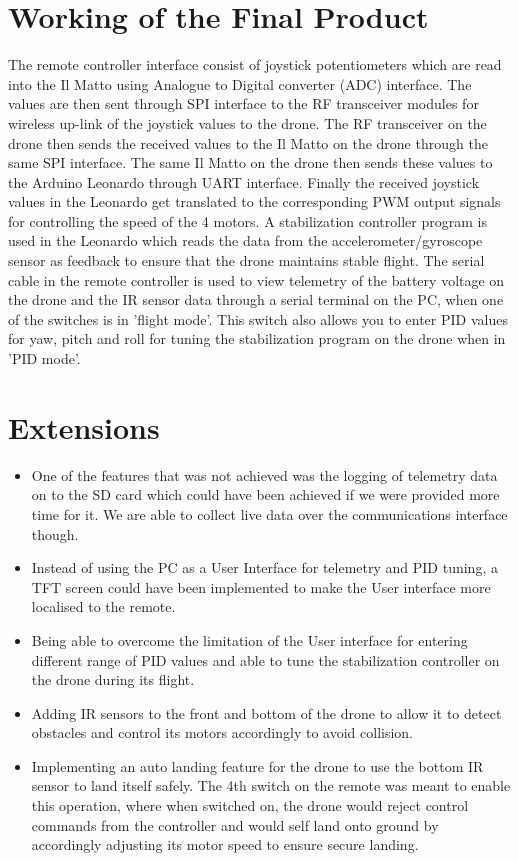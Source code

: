 \documentclass{article}
\begin{document}
\section{Working of the Final Product}
The remote controller interface consist of joystick potentiometers which are read into the Il Matto using Analogue to Digital converter (ADC) interface. The values are then sent through SPI interface to the RF transceiver modules for wireless up-link of the joystick values to the drone. The RF transceiver on the drone then sends the received values to the Il Matto on the drone through the same SPI interface. The same Il Matto on the drone then sends these values to the Arduino Leonardo through UART interface. Finally the received joystick values in the Leonardo get translated to the corresponding PWM output signals for controlling the speed of the 4 motors. A stabilization controller program is used in the Leonardo which reads the data from the accelerometer/gyroscope sensor as feedback to ensure that the drone maintains stable flight. 
The serial cable in the remote controller is used to view telemetry of the battery voltage on the drone and the IR sensor data through a serial terminal on the PC, when one of the switches is in 'flight mode'. This switch also allows you to enter PID values for yaw, pitch and roll for tuning the stabilization program on the drone when in 'PID mode'.
\section{Extensions}
\begin{itemize}
    \item One of the features that was not achieved was the logging of telemetry data on to the SD card which could have been achieved if we were provided more time for it. We are able to collect live data over the communications interface though. 
    \item Instead of using the PC as a User Interface for telemetry and PID tuning, a TFT screen could have been implemented to make the User interface more localised to the remote.
    \item Being able to overcome the limitation of the User interface for entering different range of PID values and able to tune the stabilization controller on the drone during its flight.
    \item Adding IR sensors to the front and bottom of the drone to allow it to detect obstacles and control its motors accordingly to avoid collision.
    \item Implementing an auto landing feature for the drone to use the bottom IR sensor to land itself safely. The 4th switch on the remote was meant to enable this operation, where when switched on, the drone would reject control commands from the controller and would self land onto ground by accordingly adjusting its motor speed to ensure secure landing.
\end{itemize}
\end{document}
